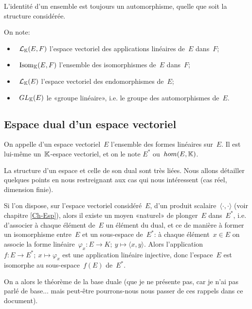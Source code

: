 \medskip
L'identité d'un ensemble est toujours un automorphisme, quelle que soit la structure considérée.

\medskip
On note:
\begin{itemize}
  \item~$\mathcal{L}_{\mathbb K}(E,F)$ l'espace vectoriel des applications linéaires de~$E$ dans~$F$;
  \item~$\operatorname{Isom}_{\mathbb K}(E,F)$ l'ensemble des isomorphismes de~$E$ dans~$F$;
  \item~$\mathcal{L}_{\mathbb K}(E)$ l'espace vectoriel des endomorphismes de~$E$;
  \item~$GL_{\mathbb K}(E)$ le «groupe linéaire», i.e. le groupe des automorphismes de~$E$.
\end{itemize}

\medskip
\subsection{Espace dual d'un espace vectoriel}

\begin{definition}
On appelle  d'un espace vectoriel~$E$ l'ensemble des formes linéaires sur~$E$. Il est lui-même un~$\mathbb K$-espace vectoriel, et on le note $E^*$ ou~$hom(E,\mathbb K)$.
\end{definition}

La structure d'un espace et celle de son dual sont très liées.
Nous allons détailler quelques points en nous restreignant aux cas qui nous intéressent (cas réel, dimension finie).

\medskip
{}
Si l'on dispose, sur l'espace vectoriel considéré~$E$, d'un produit scalaire~$\langle\cdot,\cdot\rangle$ (voir chapitre \ref{Ch-Esp}), alors il existe un moyen «naturel» de plonger~$E$ dans~$E^*$, i.e. d'associer à chaque élément de~$E$ un élément du dual, et ce de manière à former un isomorphisme entre~$E$ et un sous-espace de~$E^*$:
à chaque élément~$x\in E$ on associe la forme linéaire~$\varphi_x: E \to K;\ y \mapsto \langle x,y\rangle$.
Alors l'application~$f: E \to E^*;\ x \mapsto \varphi_x$ est une application linéaire injective, donc l'espace~$E$ est isomorphe au sous-espace~$f(E)$ de~$E^*$.

\medskip
{}
On a alors le théorème de la base duale (que je ne présente pas, car je n'ai pas parlé de base... mais peut-être pourrons-nous nous passer de ces rappels dans ce document).

